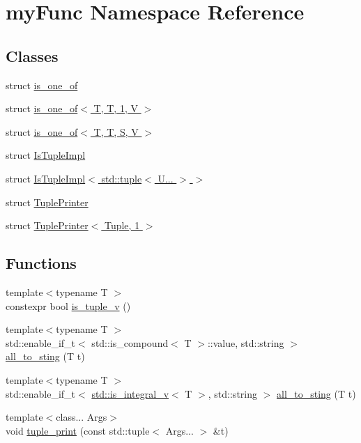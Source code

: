 \hypertarget{namespacemyFunc}{}\section{my\+Func Namespace Reference}
\label{namespacemyFunc}
\subsection*{Classes}
\begin{DoxyCompactItemize}
\item 
struct \hyperlink{structmyFunc_1_1is__one__of}{is\+\_\+one\+\_\+of}
\item 
struct \hyperlink{structmyFunc_1_1is__one__of_3_01T_00_01T_00_011_00_01V_01_4}{is\+\_\+one\+\_\+of$<$ T, T, 1, V $>$}
\item 
struct \hyperlink{structmyFunc_1_1is__one__of_3_01T_00_01T_00_01S_00_01V_01_4}{is\+\_\+one\+\_\+of$<$ T, T, S, V $>$}
\item 
struct \hyperlink{structmyFunc_1_1IsTupleImpl}{Is\+Tuple\+Impl}
\item 
struct \hyperlink{structmyFunc_1_1IsTupleImpl_3_01std_1_1tuple_3_01U_8_8_8_01_4_01_4}{Is\+Tuple\+Impl$<$ std\+::tuple$<$ U... $>$ $>$}
\item 
struct \hyperlink{structmyFunc_1_1TuplePrinter}{Tuple\+Printer}
\item 
struct \hyperlink{structmyFunc_1_1TuplePrinter_3_01Tuple_00_011_01_4}{Tuple\+Printer$<$ Tuple, 1 $>$}
\end{DoxyCompactItemize}
\subsection*{Functions}
\begin{DoxyCompactItemize}
\item 
{\footnotesize template$<$typename T $>$ }\\constexpr bool \hyperlink{namespacemyFunc_afe24a25839d94fd3368128576589722a}{is\+\_\+tuple\+\_\+v} ()
\item 
{\footnotesize template$<$typename T $>$ }\\std\+::enable\+\_\+if\+\_\+t$<$ std\+::is\+\_\+compound$<$ T $>$\+::value, std\+::string $>$ \hyperlink{namespacemyFunc_a3f0d86a5a675a3cdfae97fe12405c6a9}{all\+\_\+to\+\_\+sting} (T t)
\item 
{\footnotesize template$<$typename T $>$ }\\std\+::enable\+\_\+if\+\_\+t$<$ \hyperlink{namespacestd_a824c5eb1a7e8aafa382dc9af3329a9e8}{std\+::is\+\_\+integral\+\_\+v}$<$ T $>$, std\+::string $>$ \hyperlink{namespacemyFunc_a501f8e9903912dcbd57e865a214c6568}{all\+\_\+to\+\_\+sting} (T t)
\item 
{\footnotesize template$<$class... Args$>$ }\\void \hyperlink{namespacemyFunc_a6588b7e742bf09aefea7d531f5c8ca6e}{tuple\+\_\+print} (const std\+::tuple$<$ Args... $>$ \&t)
\end{DoxyCompactItemize}
